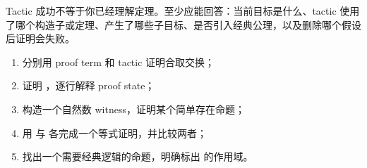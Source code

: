 \begin{warningbox}
Tactic 成功不等于你已经理解定理。至少应能回答：当前目标是什么、tactic 使用了哪个构造子或定理、产生了哪些子目标、是否引入经典公理，以及删除哪个假设后证明会失败。
\end{warningbox}

\begin{checkpointbox}
\begin{enumerate}
  \item 分别用 proof term 和 tactic 证明合取交换；
  \item 证明 ，逐行解释 proof state；
  \item 构造一个自然数 witness，证明某个简单存在命题；
  \item 用  与  各完成一个等式证明，并比较两者；
  \item 找出一个需要经典逻辑的命题，明确标出  的作用域。
\end{enumerate}
\end{checkpointbox}
